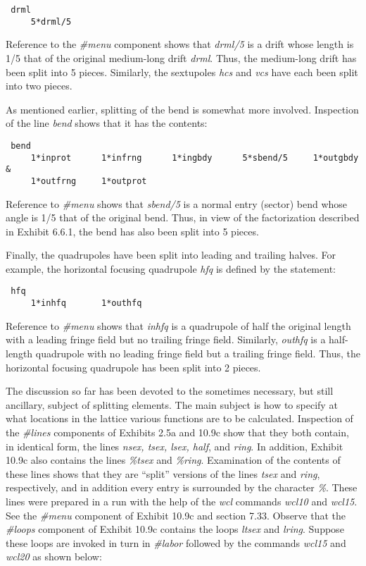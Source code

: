 \begin{footnotesize}
\begin{verbatim}
 drml
     5*drml/5
\end{verbatim}
\end{footnotesize}
Reference to the {\em \#menu} component shows that {\em drml/5} is a drift
whose length is 1/5 that of the original medium-long drift {\em drml}.
Thus, the medium-long drift has been split into 5 pieces.  Similarly, the
sextupoles {\em hcs} and {\em vcs} have each been split into two pieces.

As mentioned earlier, splitting of the bend is somewhat more involved.
Inspection of the line {\em bend} shows that it has the contents:

\begin{footnotesize}
\begin{verbatim}
 bend
     1*inprot      1*infrng      1*ingbdy      5*sbend/5     1*outgbdy  &
     1*outfrng     1*outprot
\end{verbatim}
\end{footnotesize}
Reference to {\em \#menu} shows that {\em sbend/5} is a normal entry (sector)
bend whose angle is 1/5 that of the original bend.  Thus, in view of the
factorization described in Exhibit 6.6.1, the bend has also been split
into 5 pieces.

Finally, the quadrupoles have been split into leading and trailing
halves.  For example, the horizontal focusing quadrupole {\em hfq} is
defined by the statement:

\begin{footnotesize}
\begin{verbatim}
 hfq
     1*inhfq       1*outhfq
\end{verbatim}
\end{footnotesize}
Reference to {\em \#menu} shows that {\em inhfq} is a quadrupole of half
the original length with a leading fringe field but no trailing fringe
field.  Similarly, {\em outhfq} is a half-length quadrupole with no
leading fringe field but a trailing fringe field.  Thus, the horizontal
focusing quadrupole has been split into 2 pieces.

The discussion so far has been devoted to the sometimes necessary, but
still ancillary, subject of splitting elements.  The main subject is how
to specify at what locations in the lattice various functions are to be calculated.
Inspection of the {\em \#lines} components of Exhibits 2.5a and 10.9c
show that they both contain, in identical form, the lines {\em nsex, tsex,
lsex, half}, and {\em ring}.  In addition, Exhibit 10.9c also contains
the lines {\em \%tsex} and {\em \%ring}.  Examination of the contents of
these lines shows that they are ``split'' versions of the lines {\em
tsex} and {\em ring}, respectively, and in addition every entry is
surrounded by the character {\em \%}.  These lines were prepared in a
\Mary run with the help of the {\em wcl} commands {\em wcl10} and {\em
wcl15}.  See the {\em \#menu} component of Exhibit 10.9c and section
7.33.  Observe that the {\em \#loops} component of Exhibit 10.9c contains
the loops {\em ltsex} and {\em lring}.  Suppose these loops are invoked
in turn in {\em \#labor} followed by the commands {\em wcl15} and {\em
wcl20} as shown below:

